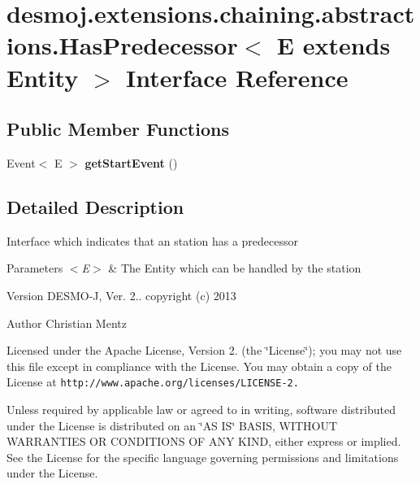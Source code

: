 \section{desmoj.\-extensions.\-chaining.\-abstractions.\-Has\-Predecessor$<$ E extends Entity $>$ Interface Reference}
\label{interfacedesmoj_1_1extensions_1_1chaining_1_1abstractions_1_1_has_predecessor_3_01_e_01extends_01_entity_01_4}
\subsection*{Public Member Functions}
\begin{DoxyCompactItemize}
\item 
Event$<$ E $>$ {\bf get\-Start\-Event} ()
\end{DoxyCompactItemize}


\subsection{Detailed Description}
Interface which indicates that an station has a predecessor


\begin{DoxyParams}{Parameters}
{\em $<$\-E$>$} & The Entity which can be handled by the station\\
\hline
\end{DoxyParams}
\begin{DoxyVersion}{Version}
D\-E\-S\-M\-O-\/\-J, Ver. 2.. copyright (c) 2013 
\end{DoxyVersion}
\begin{DoxyAuthor}{Author}
Christian Mentz
\end{DoxyAuthor}
Licensed under the Apache License, Version 2. (the \char`\"{}\-License\char`\"{}); you may not use this file except in compliance with the License. You may obtain a copy of the License at {\tt http\-://www.\-apache.\-org/licenses/\-L\-I\-C\-E\-N\-S\-E-\/2.}

Unless required by applicable law or agreed to in writing, software distributed under the License is distributed on an \char`\"{}\-A\-S I\-S\char`\"{} B\-A\-S\-I\-S, W\-I\-T\-H\-O\-U\-T W\-A\-R\-R\-A\-N\-T\-I\-E\-S O\-R C\-O\-N\-D\-I\-T\-I\-O\-N\-S O\-F A\-N\-Y K\-I\-N\-D, either express or implied. See the License for the specific language governing permissions and limitations under the License. 

